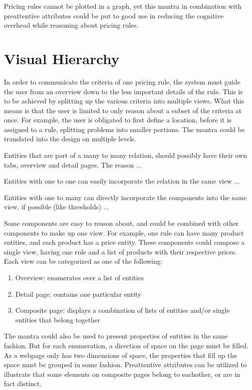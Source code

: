 Pricing rules cannot be plotted in a graph, yet this mantra in combination with preattentive attributes could be put to good use in reducing the cognitive overhead while reasoning about pricing rules.

%
\section{Visual Hierarchy}
In order to communicate the criteria of one pricing rule, the system must guide the user from an overview down to the less important details of the rule. This is to be achieved by splitting up the various criteria into multiple views. What this means is that the user is limited to only reason about a subset of the criteria at once. For example, the user is obligated to first define a location, before it is assigned to a rule, splitting problems into smaller portions. The mantra could be translated into the design on multiple levels.

Entities that are part of a many to many relation, should possibly have their own tabs, overview and detail pages. The reason ...

Entities with one to one can easily incorporate the relation in the same view ...

Entities with one to many can directly incorporate the components into the same view, if possible (like thresholds) ...


Some components are easy to reason about, and could be combined with other components to make up one view. For example, one rule can have many product entities, and each product has a price entity. These components could compose a single view, having one rule and a list of products with their respective prices. Each view can be categorized as one of the following:

\begin{enumerate}
	\item Overview: enumerates over a list of entities
	\item Detail page: contains one particular entity
	\item Composite page: displays a combination of lists of entities and/or single entities that belong together
\end{enumerate}

The mantra could also be used to present properties of entities in the same fashion. But for each enumeration, a direction of space on the page must be filled. As a webpage only has two dimensions of space, the properties that fill up the space must be grouped in some fashion. Preattentive attributes can be utilized to illustrate that some elements on composite pages belong to eachother, or are in fact distinct.

